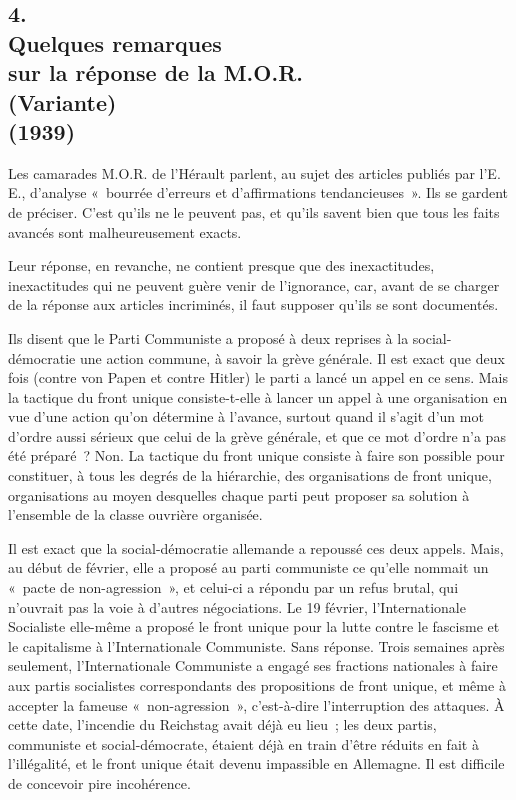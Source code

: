 \documentclass[french,twoside]{book} %
\begin{document}
\subsection[{4. Quelques remarques, sur la réponse de la M.O.R. (Variante) (1939)}]{4. \\
Quelques remarques \\
sur la réponse de la M.O.R. \\
(Variante) \\
(1939)}
\noindent \par
Les camarades M.O.R. de l'Hérault parlent, au sujet des articles publiés par l'E. E., d'analyse « bourrée d'erreurs et d'affirmations tendancieuses ». Ils se gardent de préciser. C'est qu'ils ne le peuvent pas, et qu'ils savent bien que tous les faits avancés sont malheureusement exacts.\par
Leur réponse, en revanche, ne contient presque que des inexactitudes, inexactitudes qui ne peuvent guère venir de l'ignorance, car, avant de se charger de la réponse aux articles incriminés, il faut supposer qu'ils se sont documentés.\par
Ils disent que le Parti Communiste a proposé à deux reprises à la social-démocratie une action commune, à savoir la grève générale. Il est exact que deux fois (contre von Papen et contre Hitler) le parti a lancé un appel en ce sens. Mais la tactique du front unique consiste-t-elle à lancer un appel à une organisation en vue d'une action qu'on détermine à l'avance, surtout quand il s'agit d'un mot d'ordre aussi sérieux que celui de la grève générale, et que ce mot d'ordre n'a pas été préparé ? Non. La tactique du front unique consiste à faire son possible pour constituer, à tous les degrés de la hiérarchie, des organisations de front unique, organisations au moyen desquelles chaque parti peut proposer sa solution à l'ensemble de la classe ouvrière organisée.\par
Il est exact que la social-démocratie allemande a repoussé ces deux appels. Mais, au début de février, elle a proposé au parti communiste ce qu'elle nommait un « pacte de non-agression », et celui-ci a répondu par un refus brutal, qui n'ouvrait pas la voie à d'autres négociations. Le 19 février, l'Inter­nationale Socialiste elle-même a proposé le front unique pour la lutte contre le fascisme et le capitalisme à l'Internationale Communiste. Sans réponse. Trois semaines après seulement, l'Internationale Communiste a engagé ses fractions nationales à faire aux partis socialistes correspondants des propositions de front unique, et même à accepter la fameuse « non-agression », c'est-à-dire l'interruption des attaques. À cette date, l'incendie du Reichstag avait déjà eu lieu ; les deux partis, communiste et social-démocrate, étaient déjà en train d'être réduits en fait à l'illégalité, et le front unique était devenu impassible en Allemagne. Il est difficile de concevoir pire incohérence.\par
\end{document}
